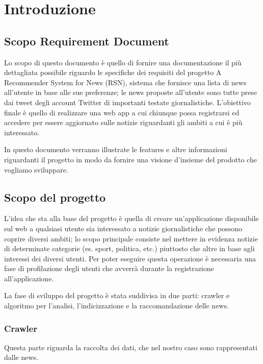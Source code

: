 \documentclass[12pt]{article}
\title{}
\author{A Recommender System for News (RSN)}
\begin{document}
\tableofcontents
\pagebreak
\renewcommand{\thesection}{\arabic{section}}
\section{Introduzione}
\subsection{Scopo Requirement Document}
 
 Lo scopo di questo documento è quello di fornire una documentazione il più dettagliata possibile riguardo le specifiche dei requisiti del progetto A Recommender System for News (RSN), sistema che fornisce una lista di news all’utente in base alle sue preferenze; le news proposte all’utente sono tutte prese dai tweet degli account Twitter di importanti testate giornalistiche. L’obiettivo finale è quello di realizzare una web app a cui chiunque possa registrarsi ed accedere per essere aggiornato sulle notizie riguardanti gli ambiti a cui è più interessato.
 
In questo documento verranno illustrate le features e altre informazioni riguardanti il progetto in modo da fornire una visione d’insieme del prodotto che vogliamo sviluppare.
 
 
\subsection{Scopo del progetto}

L’idea che sta alla base del progetto è quella di creare un’applicazione disponibile sul web a qualsiasi utente sia interessato a notizie giornalistiche che possono coprire diversi ambiti; lo scopo principale consiste nel mettere in evidenza notizie di determinate categorie (es. sport, politica, etc.) piuttosto che altre in base agli interessi dei diversi utenti. Per poter eseguire questa operazione è necessaria una fase di profilazione degli utenti che avverrà durante la registrazione all’applicazione.

La fase di sviluppo del progetto è stata suddivisa in due parti: crawler e algoritmo per l’analisi, l’indicizzazione e la raccomandazione delle news.
 
\subsubsection{Crawler} 

Questa parte riguarda la raccolta dei dati, che nel nostro caso sono rappresentati dalle news.
\end{document}
